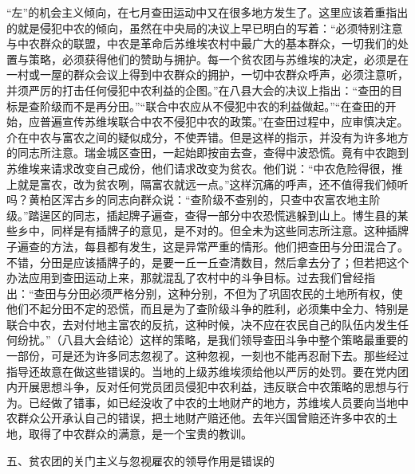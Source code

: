 “左”的机会主义倾向，在七月查田运动中又在很多地方发生了。这里应该着重指出的就是侵犯中农的倾向，虽然在中央局的决议上早已明白的写着：“必须特别注意与中农群众的联盟，中农是革命后苏维埃农村中最广大的基本群众，一切我们的处置与策略，必须获得他们的赞助与拥护。每一个贫农团与苏维埃的决定，必须是在一村或一屋的群众会议上得到中农群众的拥护，一切中农群众呼声，必须注意听，并须严厉的打击任何侵犯中农利益的企图。”在八县大会的决议上指出：“查田的目标是查阶级而不是再分田。”“联合中农应从不侵犯中农的利益做起。”“在查田的开始，应普遍宣传苏维埃联合中农不侵犯中农的政策。”在查田过程中，应审慎决定。介在中农与富农之间的疑似成分，不使弄错。但是这样的指示，并没有为许多地方的同志所注意。瑞金城区查田，一起始即按亩去查，查得中波恐慌。竟有中农跑到苏维埃来请求改变自己成份，他们请求改变为贫农。他们说：“中农危险得很，推上就是富农，改为贫农咧，隔富农就远一点。”这样沉痛的呼声，还不值得我们倾听吗？黄柏区浑古乡的同志向群众说：“查阶级不查别的，只查中农富农地主阶级。”踏逞区的同志，插起牌子遍查，查得一部分中农恐慌逃躲到山上。博生县的某些乡中，同样是有插牌子的意见，是不对的。但全未为这些同志所注意。这种插牌子遍查的方法，每县都有发生，这是异常严重的情形。他们把查田与分田混合了。不错，分田是应该插牌子的，是要一丘一丘查清数目，然后拿去分了；但若把这个办法应用到查田运动上来，那就混乱了农村中的斗争目标。过去我们曾经指出：“查田与分田必须严格分别，这种分别，不但为了巩固农民的土地所有权，使他们不起分田不定的恐慌，而且是为了查阶级斗争的胜利，必须集中全力、特别是联合中农，去对付地主富农的反抗，这种时候，决不应在农民自己的队伍内发生任何纷扰。”（八县大会结论）这样的策略，是我们领导查田斗争中整个策略最重要的一部份，可是还为许多同志忽视了。这种忽视，一刻也不能再忍耐下去。那些经过指导还故意在做这些错误的。当地的上级苏维埃须给他以严厉的处罚。要在党内团内开展思想斗争，反对任何党员团员侵犯中农利益，违反联合中农策略的思想与行为。已经做了错事，如已经没收了中农的土地财产的地方，苏维埃人员要向当地中农群众公开承认自己的错误，把土地财产赔还他。去年兴国曾赔还许多中农的土地，取得了中农群众的满意，是一个宝贵的教训。

五、贫农团的关门主义与忽视雇农的领导作用是错误的

